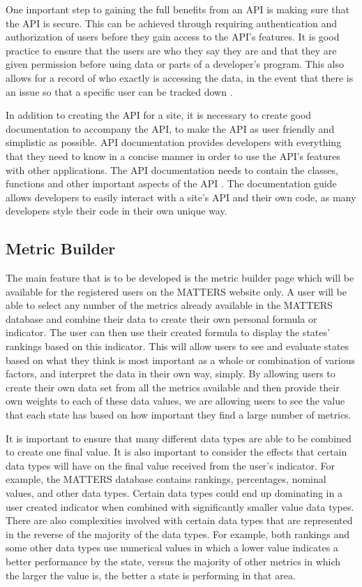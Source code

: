 One important step to gaining the full benefits from an API is making sure that the API is secure. This can be achieved through requiring authentication and authorization of users before they gain access to the API’s features. It is good practice to ensure that the users are who they say they are and that they are given permission before using data or parts of a developer’s program. This also allows for a record of who exactly is accessing the data, in the event that there is an issue so that a specific user can be tracked down \cite{jisc}.

In addition to creating the API for a site, it is necessary to create good documentation to accompany the API, to make the API as user friendly and simplistic as possible. API documentation provides developers with everything that they need to know in a concise manner in order to use the API’s features with other applications. The API documentation needs to contain the classes, functions and other important aspects of the API \cite{cio}. The documentation guide allows developers to easily interact with a site’s API and their own code, as many developers style their code in their own unique way. 

\subsection{Metric Builder}

The main feature that is to be developed is the metric builder page which will be available for the registered users on the MATTERS website only. A user will be able to select any number of the metrics already available in the MATTERS database and combine their data to create their own personal formula or indicator. The user can then use their created formula to display the states' rankings based on this indicator. This will allow users to see and evaluate states based on what they think is most important as a whole or combination of various factors, and interpret the data in their own way, simply. By allowing users to create their own data set from all the metrics available and then provide their own weights to each of these data values, we are allowing users to see the value that each state has based on how important they find a large number of metrics.

It is important to ensure that many different data types are able to be combined to create one final value. It is also important to consider the effects that certain data types will have on the final value received from the user’s indicator. For example, the MATTERS database contains rankings, percentages, nominal values, and other data types. Certain data types could end up dominating in a user created indicator when combined with significantly smaller value data types. There are also complexities involved with certain data types that are represented in the reverse of the majority of the data types. For example, both rankings and some other data types use numerical values in which a lower value indicates a better performance by the state, versus the majority of other metrics in which the larger the value is, the better a state is performing in that area. 

